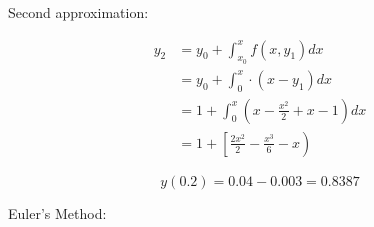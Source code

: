 \documentclass[12pt]{exam}
\begin{document}
\begin{questions}
\begin{parts}
\begin{solution}
                Second approximation:
                
                $$
                \begin{aligned}
                y_{2} & =y_{0}+\int_{x_{0}}^{x} f\left(x, y_{1}\right) d x \\
                & =y_{0}+\int_{0}^{x} \cdot\left(x-y_{1}\right) d x \\
                & =1+\int_{0}^{x}\left(x-\frac{x^{2}}{2}+x-1\right) d x \\
                & =1+\left[\frac{2 x^{2}}{2}-\frac{x^{3}}{6}-x\right)
                \end{aligned}
                $$
                
                $$
                y(0.2)= 0.04-0.003=0.8387
                $$  
            \end{solution}
        \end{parts}

        \newpage
\question Euler's Method:
\end{questions}
\end{document}
